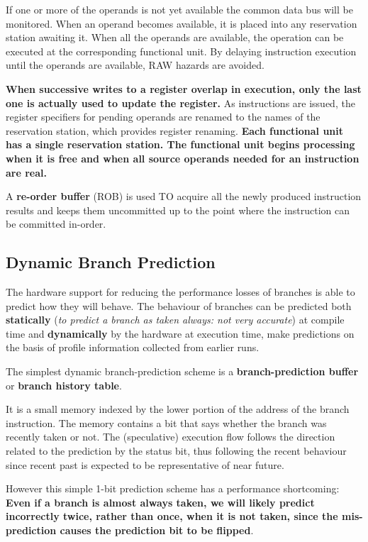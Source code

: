 \documentclass[10pt,a4paper]{article}
\begin{document}
If one or more of the operands is not yet available the common data bus will be monitored. When an operand becomes available, it is placed into any reservation station awaiting it. When all the operands are available, the operation can be executed at the corresponding functional unit. By delaying instruction execution until the operands are available, RAW hazards are avoided. 

\textbf{When successive writes to a register overlap in execution, only the last one is actually used to update the register.} As instructions are issued, the register specifiers for pending operands are renamed to the names of the reservation station, which provides register renaming. \textbf{Each functional unit has a single reservation station. The functional unit begins processing when it is free and when all source operands needed for an instruction are real.}

A \textbf{re-order buffer} (ROB) is used TO acquire all the newly produced instruction results and keeps them uncommitted up to the point where the instruction can be committed in-order. 



\subsection{Dynamic Branch Prediction}

The hardware support for reducing the performance losses of branches is able to predict how they will behave. The behaviour of branches can be predicted both \textbf{statically} (\textit{to predict a branch as taken always: not very accurate}) at compile time and \textbf{dynamically} by the hardware at execution time, make predictions on the basis of profile information collected from earlier runs.

The simplest dynamic branch-prediction scheme is a \textbf{branch-prediction buffer} or \textbf{branch history table}. 

It is a small memory indexed by the lower portion of the address of the branch instruction. The memory contains a bit that says whether the branch was recently taken or not. The (speculative) execution flow follows the direction related to the prediction by the status bit, thus following the recent behaviour since recent past is expected to be representative of near future.

However this simple 1-bit prediction scheme has a performance shortcoming: \textbf{Even if a branch is almost always taken, we will likely predict incorrectly twice, rather
than once, when it is not taken, since the mis-prediction causes the prediction bit to be flipped}. 
\end{document}
